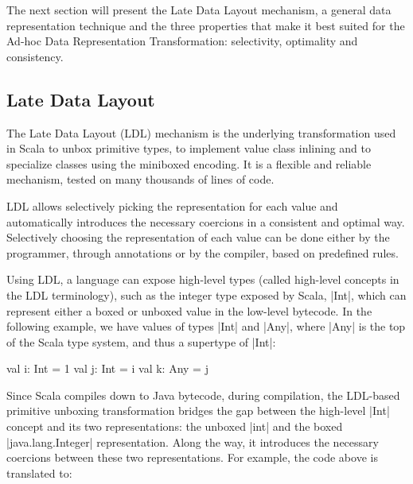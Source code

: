 The next section will present the Late Data Layout mechanism, a general data representation technique and the three properties that make it best suited for the Ad-hoc Data Representation Transformation: selectivity, optimality and consistency.

\subsection {Late Data Layout}

The Late Data Layout (LDL) mechanism is the underlying transformation used in Scala to unbox primitive types, to implement value class inlining and to specialize classes using the miniboxed encoding. It is a flexible and reliable mechanism, tested on many thousands of lines of code. %

LDL allows selectively picking the representation for each value and automatically introduces the necessary coercions in a consistent and optimal way. Selectively choosing the representation of each value can be done either by the programmer, through annotations or by the compiler, based on predefined rules.

Using LDL, a language can expose high-level types (called high-level concepts in the LDL terminology), such as the integer type exposed by Scala, |Int|, which can represent either a boxed or unboxed value in the low-level bytecode. In the following example, we have values of types |Int| and |Any|, where |Any| is the top of the Scala type system, and thus a supertype of |Int|:

\begin{lstlisting-nobreak}
val i: Int = 1
val j: Int = i
val k: Any = j
\end{lstlisting-nobreak}

Since Scala compiles down to Java bytecode, during compilation, the LDL-based primitive unboxing transformation bridges the gap between the high-level |Int| concept and its two representations: the unboxed |int| and the boxed |java.lang.Integer| representation. Along the way, it introduces the necessary coercions between these two representations. For example, the code above is translated to:

